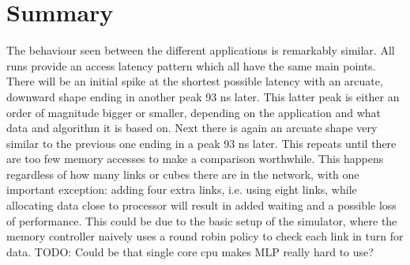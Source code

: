 

\section{Summary}
The behaviour seen between the different applications is remarkably similar. All runs provide an access latency pattern which all have the same main points. There will be an initial spike at the shortest possible latency with an arcuate, downward shape ending in another peak 93 ns later. This latter peak is either an order of magnitude bigger or smaller, depending on the application and what data and algorithm it is based on. Next there is again an arcuate shape very similar to the previous one ending in a peak 93 ns later. This repeats until there are too few memory accesses to make a comparison worthwhile. This happens regardless of how many links or cubes there are in the network, with one important exception: adding four extra links, i.e. using eight links, while allocating data close to processor will result in added waiting and a possible loss of performance. This could be due to the basic setup of the simulator, where the memory controller naively uses a round robin policy to check each link in turn for data. TODO: Could be that single core cpu makes MLP really hard to use?

